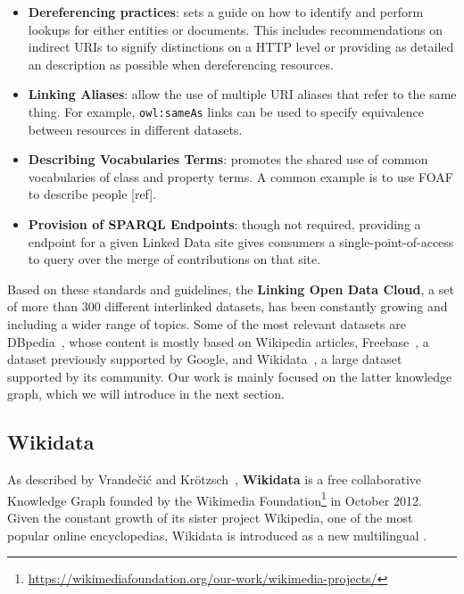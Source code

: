 \begin{itemize}
    \item \textbf{Dereferencing practices}: sets a guide on how to identify and perform lookups 
    for either entities or documents. This includes recommendations on indirect URIs to signify 
    distinctions on a HTTP level or providing as detailed an \RDF{} description as possible when 
    dereferencing resources. 
    \item \textbf{Linking Aliases}: allow the use of multiple URI aliases that refer to the same 
    thing. For example, \texttt{owl:sameAs} links can be used to specify equivalence between 
    resources in different datasets.
    \item \textbf{Describing Vocabularies Terms}: promotes the shared use of common vocabularies 
    of class and property terms. A common example is to use FOAF to describe people [ref].
    \item \textbf{Provision of SPARQL Endpoints}: though not required, providing a \SPARQL{} endpoint 
    for a given Linked Data site gives consumers a single-point-of-access to query over the merge 
    of contributions on that site.
\end{itemize} %

Based on these standards and guidelines, the \textbf{Linking Open Data Cloud}, a set of more than 
300 different interlinked \RDF{} datasets, has been constantly growing and including a wider range of 
topics. Some of the most relevant datasets are DBpedia~\cite{KG:dbpedia}, whose content is mostly 
based on Wikipedia articles, Freebase~\cite{KG:freebase}, a dataset previously supported by Google, 
and Wikidata~\cite{KG:wikidata}, a large dataset supported by its community. Our work is mainly 
focused on the latter knowledge graph, which we will introduce in the next section.

\subsection{Wikidata}
\label{cap2:semWeb/wikidata}
As described by Vrandečić and Krötzsch~\cite{KG:wikidata}, \textbf{Wikidata} is a free 
collaborative Knowledge Graph founded by the Wikimedia Foundation\footnote{\url{https://wikimediafoundation.org/our-work/wikimedia-projects/}} 
in October 2012. Given the constant growth of its sister project Wikipedia, one of the most 
popular online encyclopedias, Wikidata is introduced as a new multilingual 
. 

